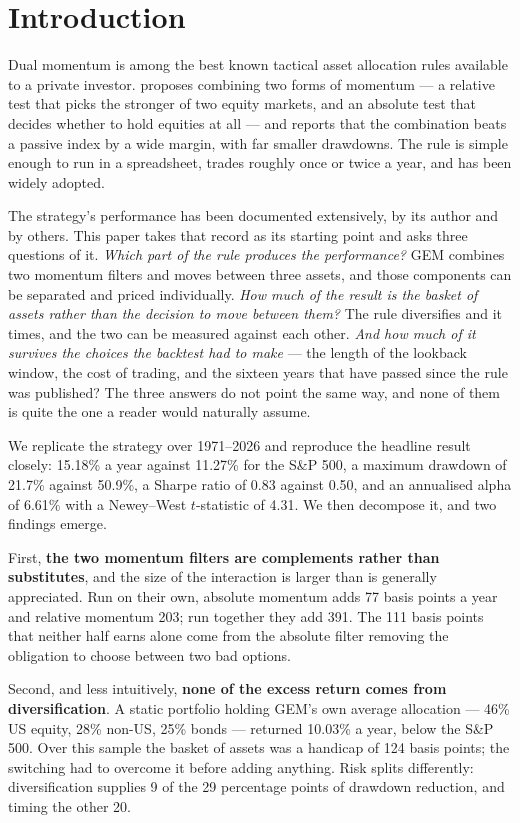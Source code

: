 \documentclass[11pt,a4paper]{article}
\let\oldsection\section
\renewcommand{\section}{\FloatBarrier\oldsection}
\begin{document}
\section{Introduction}

Dual momentum is among the best known tactical asset allocation rules available
to a private investor. \citet{antonacci2016} proposes combining two forms of
momentum --- a relative test that picks the stronger of two equity markets, and
an absolute test that decides whether to hold equities at all --- and reports
that the combination beats a passive index by a wide margin, with far smaller
drawdowns. The rule is simple enough to run in a spreadsheet, trades roughly
once or twice a year, and has been widely adopted.

The strategy's performance has been documented extensively, by its author and
by others. This paper takes that record as its starting point and asks three
questions of it. \emph{Which part of the rule produces the performance?} GEM
combines two momentum filters and moves between three assets, and those
components can be separated and priced individually. \emph{How much of the
result is the basket of assets rather than the decision to move between them?}
The rule diversifies and it times, and the two can be measured against each
other. \emph{And how much of it survives the choices the backtest had to
make} --- the length of the lookback window, the cost of trading, and the
sixteen years that have passed since the rule was published? The three answers
do not point the same way, and none of them is quite the one a reader would
naturally assume.

We replicate the strategy over 1971--2026 and reproduce the headline result
closely: 15.18\% a year against 11.27\% for the S\&P 500, a maximum drawdown of
21.7\% against 50.9\%, a Sharpe ratio of 0.83 against 0.50, and an annualised
alpha of 6.61\% with a Newey--West $t$-statistic of 4.31. We then decompose it,
and two findings emerge.

First, \textbf{the two momentum filters are complements rather than
substitutes}, and the size of the interaction is larger than is generally
appreciated. Run on their own, absolute momentum adds 77 basis points a year
and relative momentum 203; run together they add 391. The 111 basis points that
neither half earns alone come from the absolute filter removing the obligation
to choose between two bad options.

Second, and less intuitively, \textbf{none of the excess return comes from
diversification}. A static portfolio holding GEM's own average allocation ---
46\% US equity, 28\% non-US, 25\% bonds --- returned 10.03\% a year, below the
S\&P 500. Over this sample the basket of assets was a handicap of 124 basis
points; the switching had to overcome it before adding anything. Risk splits
differently: diversification supplies 9 of the 29 percentage points of drawdown
reduction, and timing the other 20.
\end{document}
